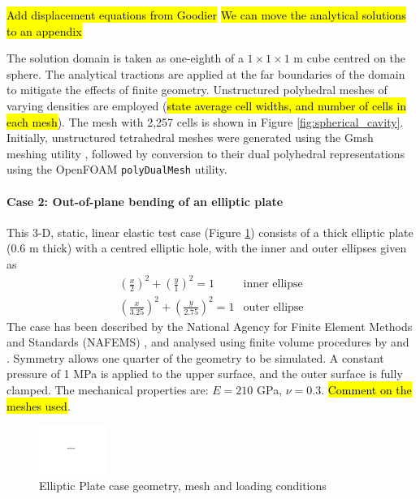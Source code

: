 \documentclass[sn-mathphys,Numbered]{sn-jnl}%
\begin{document}
\hl{Add displacement equations from Goodier}
\hl{We can move the analytical solutions to an appendix}

The solution domain is taken as one-eighth of a $1 \times 1 \times 1$ m cube centred on the sphere.
The analytical tractions are applied at the far boundaries of the domain to mitigate the effects of finite geometry.
Unstructured polyhedral meshes of varying densities are employed (\hl{state average cell widths, and number of cells in each mesh}).
The mesh with 2,257 cells is shown in Figure \ref{fig:spherical_cavity}.
Initially, unstructured tetrahedral meshes were generated using the Gmsh meshing utility \cite{geuzaine2009gmsh}, followed by conversion to their dual polyhedral representations using the OpenFOAM \texttt{polyDualMesh} utility.


\paragraph{Case 2: Out-of-plane bending of an elliptic plate}
This 3-D, static, linear elastic test case (Figure \ref{fig:elliptic_plate}) consists of a thick elliptic plate (0.6 m thick) with a centred elliptic hole, with the inner and outer ellipses given as
\begin{eqnarray}
	\left(\frac{x}{2}\right)^2 + \left(\frac{y}{1}\right)^2 = 1 & \text{inner ellipse} \\
	\left(\frac{x}{3.25}\right)^2 + \left(\frac{y}{2.75}\right)^2 = 1 & \text{outer ellipse}
\end{eqnarray}
The case has been described by the National Agency for Finite Element Methods and Standards (NAFEMS) \cite{NAFEMS}, and analysed using finite volume procedures by \citet{Demirdzic} and \citet{Cardiff2016}.
Symmetry allows one quarter of the geometry to be simulated.
A constant pressure of 1 MPa is applied to the upper surface, and the outer surface is fully clamped.
The mechanical properties are: $E = 210$ GPa, $\nu = 0.3$.
\hl{Comment on the meshes used}.
\begin{figure}[htbp]
   \centering
   \includegraphics[width=0.2\textwidth]{figures/placeholder.pdf} 
   \caption{Elliptic Plate case geometry, mesh and loading conditions}
   \label{fig:elliptic_plate}
\end{figure}
\end{document}
